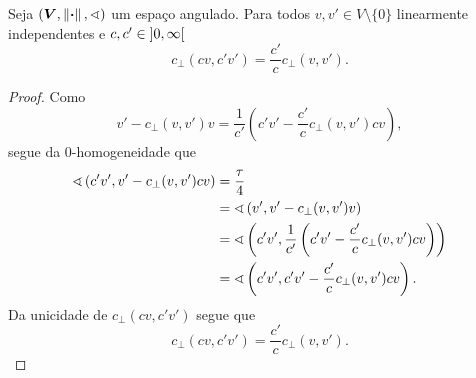 \begin{proposition}
\label{prop:geo.cperpproporcao}
Seja $(\bm V, \left\Vert{\bm{\cdot}}\right\Vert,\sphericalangle)$ um espaço angulado. Para todos $v,v' \in V \setminus \{0\}$ linearmente independentes e $c,c' \in \left]0,\allowbreak \infty\right[$
	\begin{equation*}
	c_{\perp}(cv,c'v') = \frac{c'}{c}c_{\perp}(v,v').
	\end{equation*}
\end{proposition}
\begin{proof}
Como
	\begin{equation*}
	v'-c_{\perp}(v,v')v = \frac{1}{c'}\left( c'v'-\frac{c'}{c}c_{\perp}(v,v')cv \right),
	\end{equation*}
segue da $0$-homogeneidade que
	\begin{align*}
		\sphericalangle\left({c'v'},{v'-c_{\perp}(v,v')cv}\right) &= \frac{\tau}{4} \\
		&= \sphericalangle\left({v'},{v'-c_{\perp}(v,v')v}\right) \\
		&= \sphericalangle\left({c'v'},{\frac{1}{c'}\left( c'v'-\frac{c'}{c}c_{\perp}(v,v')cv \right)}\right) \\
		&= \sphericalangle\left({c'v'},{c'v'-\frac{c'}{c}c_{\perp}(v,v')cv}\right).
	\end{align*}
Da unicidade de $c_{\perp}(cv,c'v')$ segue que
	\begin{equation*}
	c_{\perp}(cv,c'v') = \frac{c'}{c}c_{\perp}(v,v').
	\end{equation*}
\end{proof}

